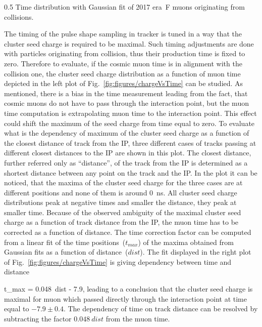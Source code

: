                  {0.5}       %
                 { Time distribution with Gaussian fit of 2017 era~F muons originating from collisions.  }


The timing of the pulse shape sampling in tracker is tuned in a way that the cluster seed charge is required to be maximal. Such timing adjustments are done with particles originating from collision, thus their production time is fixed to zero. Therefore to evaluate, if the cosmic muon time is in alignment with the collision one, the cluster seed charge distribution as a function of muon time depicted in the left plot of Fig.~\ref{fig:figures/chargeVsTime} can be studied. As mentioned, there is a bias in the time measurement leading from the fact, that cosmic muons do not have to pass through the interaction point, but the muon time computation is extrapolating muon time to the interaction point. This effect could shift the maximum of the seed charge from time equal to zero. To evaluate what is the dependency of maximum of the cluster seed charge as a function of the closest distance of track from the IP, three different cases of tracks passing at different closest distances to the IP are shown in this plot. The closest distance, further referred only as ``distance'', of the track from the IP  is determined as a shortest distance between any point on the track and the IP. In the plot it can be noticed, that the maxima of the cluster seed charge for the three cases are at different positions and none of them is around 0~ns. All cluster seed charge distributions peak at negative times and smaller the distance, they peak at smaller time. Because of the observed ambiguity of the maximal cluster seed charge as a function of track distance from the IP, the muon time has to be corrected as a function of distance. The time correction factor can be computed from a linear fit of the time positions~($t_{max}$) of the maxima obtained from Gaussian fits as a function of distance~($dist$). The fit displayed in the right plot of Fig.~\ref{fig:figures/chargeVsTime} is giving dependency between time and distance

{
t_{max} = 0.048~dist  - 7.9,
}
leading to a conclusion that the cluster seed charge is maximal for muon which passed directly through the interaction point at time equal to $-7.9 \pm 0.4 $. The dependency of time on track distance can be resolved by subtracting the factor $ 0.048~dist $ from the muon time.



